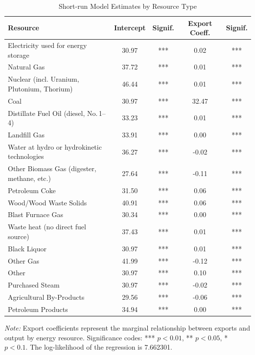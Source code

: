 \documentclass[12pt]{article}
\begin{document}
\begin{table}[htbp]
\centering
\begin{tabular}{lcccc}
\toprule
\textbf{Resource} & \textbf{Intercept} & \textbf{Signif.} & \textbf{Export Coeff.} & \textbf{Signif.} \\
\midrule
Electricity used for energy storage & 30.97 & *** & 0.02 & *** \\
Natural Gas                         & 37.72& *** & 0.01 &  ***\\
Nuclear (incl. Uranium, Plutonium, Thorium) & 46.44 & *** & 0.01 & *** \\
Coal                                & 30.97 & *** & 32.47 & *** \\
Distillate Fuel Oil (diesel, No.\,1--4) & 33.23 &  *** & 0.01 & *** \\
Landfill Gas                        & 33.91 & *** & 0.00 & *** \\
Water at hydro or hydrokinetic technologies & 36.27 & *** & -0.02 & *** \\
Other Biomass Gas (digester, methane, etc.) & 27.64 & *** & -0.11 & *** \\
Petroleum Coke                      & 31.50 & *** & 0.06 &  ***\\
Wood/Wood Waste Solids              & 40.91 &  ***& 0.06 &  ***\\
Blast Furnace Gas                   & 30.34 & *** & 0.00 &  ***\\
Waste heat (no direct fuel source) & 37.43 & *** & 0.01 &  ***\\
Black Liquor                        & 30.97 & *** & 0.01 & *** \\
Other Gas                           & 41.99 & *** & -0.12 & *** \\
Other                               & 30.97 & *** & 0.10 & *** \\
Purchased Steam                     & 30.97 & *** & -0.02 & *** \\
Agricultural By-Products            & 29.56 & *** & -0.06 &  ***\\
Petroleum Products                  & 34.94 & *** & 0.00 & *** \\
\bottomrule
\end{tabular}
\vspace{0.5em}

\footnotesize\textit{Note:} Export coefficients represent the marginal relationship between exports and output by energy resource. Significance codes: *** $p<0.01$, ** $p<0.05$, * $p<0.1$. The log-likelihood of the regression is 7.662301.
\caption{Short-run Model Estimates by Resource Type}
\label{ResourcesTable}
\end{table}
\end{document}
